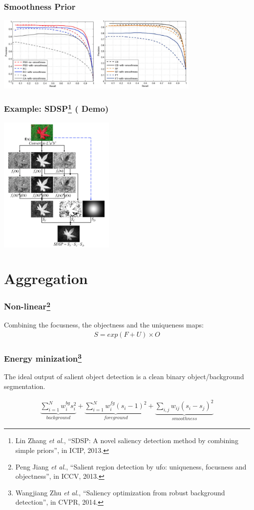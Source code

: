\documentclass[notheorems,serif,table,compress]{beamer}  %
\begin{document}
\begin{frame}
\frametitle{ Smoothness Prior}
\centering\includegraphics[width=10cm]{smoothness}
\end{frame}


\begin{frame}
\frametitle{Example: SDSP\footnote{Lin Zhang \textit{et al.}, ``SDSP: A novel saliency detection method by combining simple priors'', in ICIP, 2013.}   (\color{yellow} \textbf{Demo})}

\centering\includegraphics[width=5.7cm]{SDSP}
\end{frame}


\section{Aggregation}

\begin{frame}
\frametitle{ Non-linear\footnote{Peng Jiang \textit{et al.}, ``Salient region detection by ufo: uniqueness, focusness and objectness'', in ICCV, 2013. }}
Combining the focusness, the objectness and the uniqueness maps:
\begin{align}
S = exp( F + U) \times O
\end{align}
\end{frame}


\begin{frame}
\frametitle{ Energy minization\footnote{Wangjiang Zhu \textit{et al.}, ``Saliency optimization from robust background detection'', in CVPR, 2014.}}
The ideal output of salient object detection is a clean binary object/background segmentation.

\begin{align}
\underbrace{\sum_{i=1}^{N}w_i^{bg}s_i^2}_{background}+\underbrace{\sum_{i=1}^{N}w_i^{fg}(s_i-1)^2}_{foreground}+\underbrace{\sum_{i, j}w_{ij}(s_i-s_j)^2}_{smoothness}
\end{align}
\end{frame}
\end{document}
